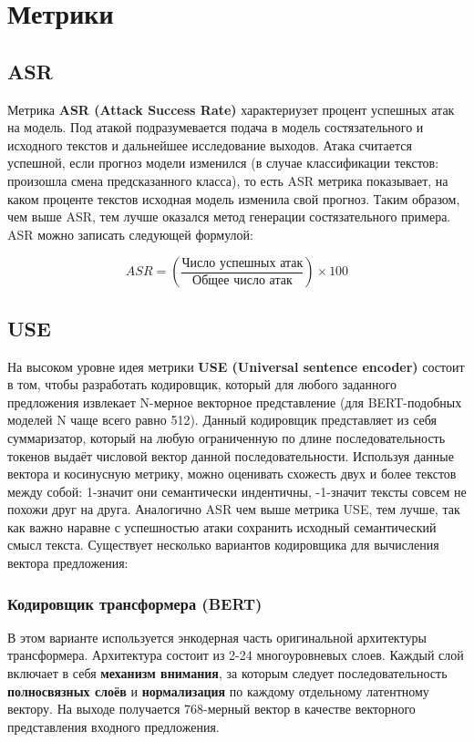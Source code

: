 \section{Метрики}
\label{sec:Metrics} 

\subsection{ASR}
\hspace{0.6cm}Метрика \textbf{ASR (Attack Success Rate)} характериузет процент успешных атак на модель. Под атакой подразумевается подача в модель состязательного и исходного текстов и дальнейшее исследование выходов. Атака считается успешной, если прогноз модели изменился (в случае классификации текстов: произошла смена предсказанного класса), то есть ASR метрика показывает, на каком проценте текстов исходная модель изменила свой прогноз. Таким образом, чем выше ASR, тем лучше оказался метод генерации состязательного примера. ASR можно записать следующей формулой:

\begin{equation*}
    ASR = \left( \frac{\text{Число успешных атак}}{\text{Общее число атак}} \right) \times 100
\end{equation*}


\subsection{USE}
\hspace{0.6cm}На высоком уровне идея метрики \textbf{USE (Universal sentence encoder)} состоит в том, чтобы разработать кодировщик, который для любого заданного предложения извлекает N-мерное векторное представление (для BERT-подобных моделей N чаще всего равно 512). Данный кодировщик представляет из себя суммаризатор, который на любую ограниченную по длине последовательность токенов выдаёт числовой вектор данной последовательности. Используя данные вектора и косинусную метрику, можно оценивать схожесть двух и более текстов между собой: 1-значит они семантически индентичны, -1-значит тексты совсем не похожи друг на друга. Аналогично ASR чем выше метрика USE, тем лучше, так как важно наравне с успешностью атаки сохранить исходный семантический смысл текста. Существует несколько вариантов кодировщика для вычисления вектора предложения:

\subsubsection{\textbf{Кодировщик трансформера (BERT)}}
\hspace{0.6cm}В этом варианте используется энкодерная часть оригинальной архитектуры трансформера. Архитектура состоит из 2-24 многоуровневых слоев. Каждый слой включает в себя \textbf{механизм внимания}, за которым следует последовательность \textbf{полносвязных слоёв} и \textbf{нормализация} по каждому отдельному латентному вектору. На выходе получается 768-мерный вектор в качестве векторного представления входного предложения.

